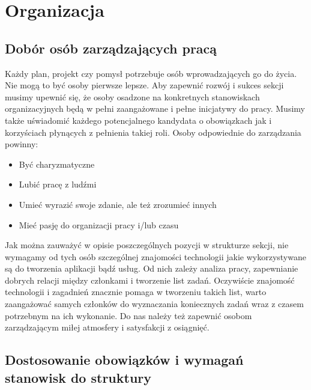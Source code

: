 \documentclass[9pt,a4paper]{report}
\begin{document}
 

\chapter{Organizacja} 

 

\section{Dobór osób zarządzających pracą} 

 

Każdy plan, projekt czy pomysł potrzebuje osób wprowadzających go do życia. Nie mogą to być osoby pierwsze lepsze. Aby zapewnić rozwój i sukces sekcji musimy upewnić się, że osoby osadzone na konkretnych stanowiskach organizacyjnych będą w pełni zaangażowane i pełne inicjatywy do pracy. Musimy także uświadomić każdego potencjalnego kandydata o obowiązkach jak i korzyściach płynących z pełnienia takiej roli. Osoby odpowiednie do zarządzania powinny:\\ 

\begin{itemize} 

\item Być charyzmatyczne 

\item Lubić pracę z ludźmi 

\item Umieć wyrazić swoje zdanie, ale też zrozumieć innych 

\item Mieć pasję do organizacji pracy i/lub czasu 

\end{itemize} 

Jak można zauważyć w opisie poszczególnych pozycji w strukturze sekcji, nie wymagamy od tych osób szczególnej znajomości technologii jakie wykorzystywane są do tworzenia aplikacji bądź usług. Od nich zależy analiza pracy, zapewnianie dobrych relacji między członkami i tworzenie list zadań. Oczywiście znajomość technologii i zagadnień znacznie pomaga w tworzeniu takich list, warto zaangażować samych członków do wyznaczania koniecznych zadań wraz z czasem potrzebnym na ich wykonanie. Do nas należy też zapewnić osobom zarządzającym miłej atmosfery i satysfakcji z osiągnięć. 

 

\section{Dostosowanie obowiązków i wymagań stanowisk do struktury} 
\end{document}
